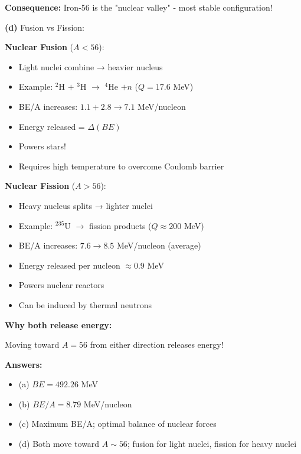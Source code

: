 \documentclass[12pt,a4paper]{article}
\begin{document}
\begin{solution}
\textbf{Consequence:} Iron-56 is the "nuclear valley" - most stable configuration!

\textbf{(d)} Fusion vs Fission:

\textbf{Nuclear Fusion} ($A < 56$):
\begin{itemize}
    \item Light nuclei combine → heavier nucleus
    \item Example: $^2$H $+$ $^3$H $\to$ $^4$He $+ n$ ($Q = 17.6$ MeV)
    \item BE/A increases: $1.1 + 2.8 \to 7.1$ MeV/nucleon
    \item Energy released = $\Delta(BE)$
    \item Powers stars!
    \item Requires high temperature to overcome Coulomb barrier
\end{itemize}

\textbf{Nuclear Fission} ($A > 56$):
\begin{itemize}
    \item Heavy nucleus splits → lighter nuclei
    \item Example: $^{235}$U $\to$ fission products ($Q \approx 200$ MeV)
    \item BE/A increases: $7.6 \to 8.5$ MeV/nucleon (average)
    \item Energy released per nucleon $\approx 0.9$ MeV
    \item Powers nuclear reactors
    \item Can be induced by thermal neutrons
\end{itemize}

\textbf{Why both release energy:}

\begin{center}
\end{center}

Moving toward $A = 56$ from either direction releases energy!

\textbf{Answers:}
\begin{itemize}
    \item (a) $BE = 492.26$ MeV
    \item (b) $BE/A = 8.79$ MeV/nucleon
    \item (c) Maximum BE/A; optimal balance of nuclear forces
    \item (d) Both move toward $A \sim 56$; fusion for light nuclei, fission for heavy nuclei
\end{itemize}
\end{solution}
\end{document}
